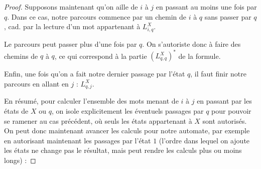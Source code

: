 \begin{proof}
Supposons maintenant qu'on aille de $i$ à $j$ en passant au moins une fois par $q$. Dans ce cas, notre parcours commence par un chemin de $i$ à $q$ sans passer par $q$, cad. par la lecture d'un mot appartenant à $L_{i,q}^X$.

Le parcours peut passer plus d'une fois par $q$. On s'autoriste donc à faire des chemins de $q$ à $q$, ce qui correspond à la partie $(L_{q,q}^X)^*$ de la formule.

Enfin, une fois qu'on a fait notre dernier passage par l'état $q$, il faut finir notre parcours en allant en $j$ : $L_{q,j}^X$.

En résumé, pour calculer l'ensemble des mots menant de $i$ à $j$ en passant par les états de $X$ ou $q$, on isole explicitement les éventuels passages par $q$ pour pouvoir se ramener au cas précédent, où seuls les états appartenant à $X$ sont autorisés. On peut donc maintenant avancer les calculs pour notre automate, par exemple en autorisant maintenant les passages par l'état $1$ (l'ordre dans lequel on ajoute les états ne change pas le résultat, mais peut rendre les calculs plus ou moins longs) :



\end{proof}
